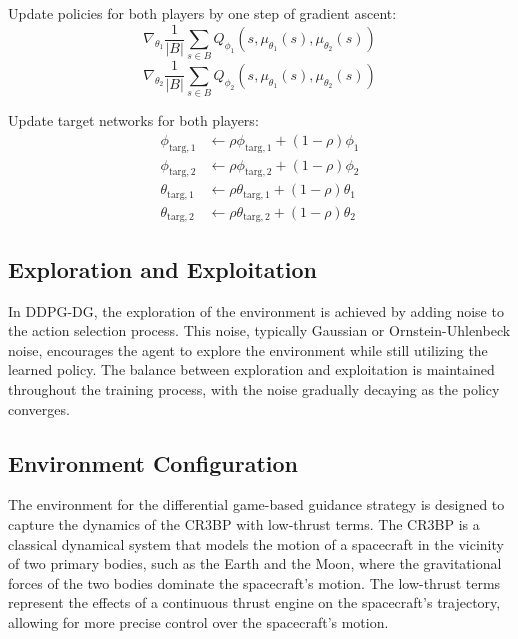 \documentclass[conference]{IEEEtran}
\begin{document}
\begin{algorithm}[H]
\begin{algorithmic}[1]
                \STATE Update policies for both players by one step of gradient ascent:
                \begin{equation*}
                    \nabla_{\theta_1} \frac{1}{|B|} \sum_{s \in B} Q_{\phi_1}(s, \mu_{\theta_1}(s), \mu_{\theta_2}(s))
                \end{equation*}
                \begin{equation*}
                    \nabla_{\theta_2} \frac{1}{|B|} \sum_{s \in B} Q_{\phi_2}(s, \mu_{\theta_1}(s), \mu_{\theta_2}(s))
                \end{equation*}

                \STATE Update target networks for both players:
                \begin{align*}
                    \phi_{\text{targ},1} &\leftarrow \rho \phi_{\text{targ},1} + (1 - \rho) \phi_1 \\
                    \phi_{\text{targ},2} &\leftarrow \rho \phi_{\text{targ},2} + (1 - \rho) \phi_2 \\
                    \theta_{\text{targ},1} &\leftarrow \rho \theta_{\text{targ},1} + (1 - \rho) \theta_1 \\
                    \theta_{\text{targ},2} &\leftarrow \rho \theta_{\text{targ},2} + (1 - \rho) \theta_2
                \end{align*}
            \ENDFOR
        \ENDIF
\end{algorithmic}
\end{algorithm}





\subsection{Exploration and Exploitation}
In DDPG-DG, the exploration of the environment is achieved by adding noise to the action selection process. This noise, typically Gaussian or Ornstein-Uhlenbeck noise, encourages the agent to explore the environment while still utilizing the learned policy. The balance between exploration and exploitation is maintained throughout the training process, with the noise gradually decaying as the policy converges.






\subsection{Environment Configuration}
The environment for the differential game-based guidance strategy is designed to capture the dynamics of the CR3BP with low-thrust terms. The CR3BP is a classical dynamical system that models the motion of a spacecraft in the vicinity of two primary bodies, such as the Earth and the Moon, where the gravitational forces of the two bodies dominate the spacecraft's motion. The low-thrust terms represent the effects of a continuous thrust engine on the spacecraft's trajectory, allowing for more precise control over the spacecraft's motion.
\end{document}
